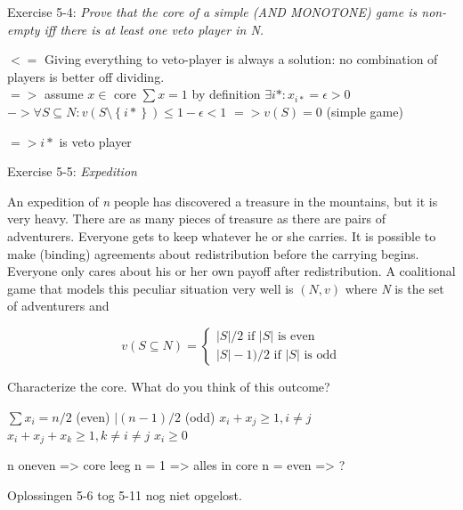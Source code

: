 \documentclass[../main.tex]{subfiles}
\begin{document}
\begin{question}
Exercise 5-4: \textit{Prove that the core of a simple (AND MONOTONE) game is non-empty iff there is at least one veto player in N.}
\end{question}

\begin{solution}
$<=$ Giving everything to veto-player is always a solution: no combination of players is better off dividing.\\

$=>$ assume $x \in $ core
$\sum x = 1$ by definition
$\exists i* : x_{i*} = \epsilon > 0$
$-> \forall S \subseteq N : v(S\setminus\left\{i*\right\}) \leq 1-\epsilon < 1$
$=> v(S) = 0$ (simple game)

$=> i*$ is veto player
\end{solution}

\begin{question}
Exercise 5-5: \textit{Expedition}

An expedition of \textit{n} people has discovered a treasure in the mountains, but it is very heavy. There are as many pieces of treasure as there are pairs of adventurers. Everyone gets to keep whatever he or she carries. It is possible to make (binding) agreements about redistribution before the carrying begins. Everyone only cares about his or her own payoff after redistribution. A coalitional game that models this peculiar situation very well is $(N,v)$ where \textit{N} is the set of adventurers and

\begin{equation}
v(S \subseteq N) = \begin{cases}
|S|/2      \text{ if } |S| \text{ is even}\\
|S|-1)/2   \text{ if } |S| \text{ is odd}
\end{cases}
\end{equation}

Characterize the core. What do you think of this outcome?
\end{question}

\begin{solution}
$\sum x_i = n/2$ (even) $| (n-1)/2$ (odd)
$x_i + x_j \geq 1, i \neq j$
$x_i + x_j + x_k \geq 1, k \neq i \neq j$
$x_i \geq 0$

n oneven => core leeg
n = 1 => alles in core
n = even => ?
\end{solution}

Oplossingen 5-6 tog 5-11 nog niet opgelost.
\end{document}

